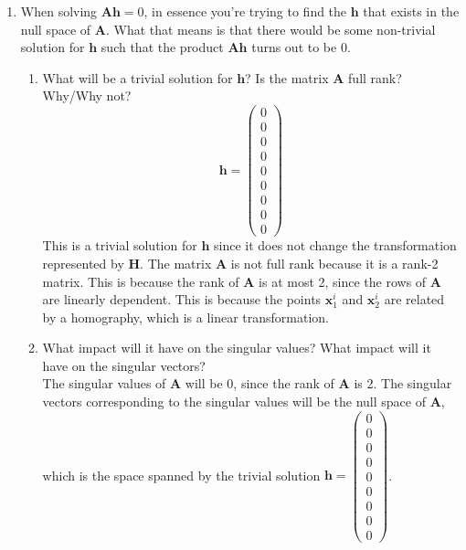 \documentclass[a3paper,12pt]{extarticle} %
\begin{document}
\begin{enumerate}
        \item When solving $\mathbf{A} \mathbf{h} = 0$, in essence you’re trying to find the $\mathbf{h}$ that exists in the null space of $\mathbf{A}$. What that means is that there would be some non-trivial solution for $\mathbf{h}$ such that the product $\mathbf{A} \mathbf{h}$ turns out to be 0.
            \begin{enumerate}
                \item What will be a trivial solution for $\mathbf{h}$? Is the matrix $\mathbf{A}$ full rank? Why/Why not?
                \[
                \mathbf{h} = \begin{pmatrix} 0 \\ 0 \\ 0 \\ 0 \\ 0 \\ 0 \\ 0 \\ 0 \\ 0 \end{pmatrix}
                \]
                This is a trivial solution for $\mathbf{h}$ since it does not change the transformation represented by $\mathbf{H}$. The matrix $\mathbf{A}$ is not full rank because it is a rank-2 matrix. This is because the rank of $\mathbf{A}$ is at most 2, since the rows of $\mathbf{A}$ are linearly dependent. This is because the points $\mathbf{x}_1^i$ and $\mathbf{x}_2^i$ are related by a homography, which is a linear transformation.
                \item What impact will it have on the singular values? What impact will it have on the singular vectors?
                \\ The singular values of $\mathbf{A}$ will be 0, since the rank of $\mathbf{A}$ is 2. The singular vectors corresponding to the singular values will be the null space of $\mathbf{A}$, which is the space spanned by the trivial solution $\mathbf{h} = \begin{pmatrix} 0 \\ 0 \\ 0 \\ 0 \\ 0 \\ 0 \\ 0 \\ 0 \\ 0 \end{pmatrix}$.
            \end{enumerate}
    \end{enumerate}
\end{document}
